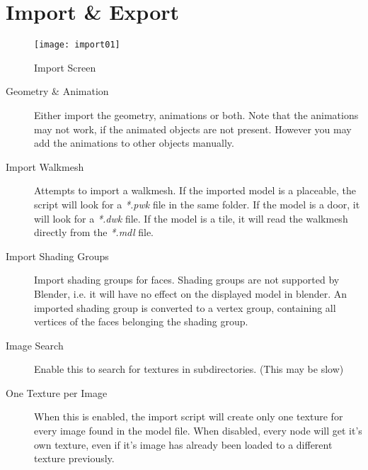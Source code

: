 \section{Import \& Export}

\begin{figure}
  \centering
  \texttt{[image: import01]}
  \caption[mdl import]{Import Screen}
  \label{fig:import01}
\end{figure}

\begin{description}
    \item[Geometry \& Animation] Either import the geometry, animations or both. Note that the animations may not work, if the animated objects are not present. However you may add the animations to other objects manually.
    \item[Import Walkmesh] Attempts to import a walkmesh. If the imported model is a placeable, the script will look for a {\textit{*.pwk}} file in the same folder. If the model is a door, it will look for a {\textit{*.dwk}} file. If the model is a tile, it will read the walkmesh directly from the {\textit{*.mdl}} file.
    \item[Import Shading Groups] Import shading groups for faces. Shading groups are not supported by Blender, i.e. it will have no effect on the displayed model in blender. An imported shading group is converted to a vertex group, containing all vertices of the faces belonging the shading group.
    \item[Image Search] Enable this to search for textures in subdirectories. (This may be slow)
    \item[One Texture per Image] When this is enabled, the import script will create only one texture for every image found in the model file. When disabled, every node will get it's own texture, even if it's image has already been loaded to a different texture previously.
\end{description}
